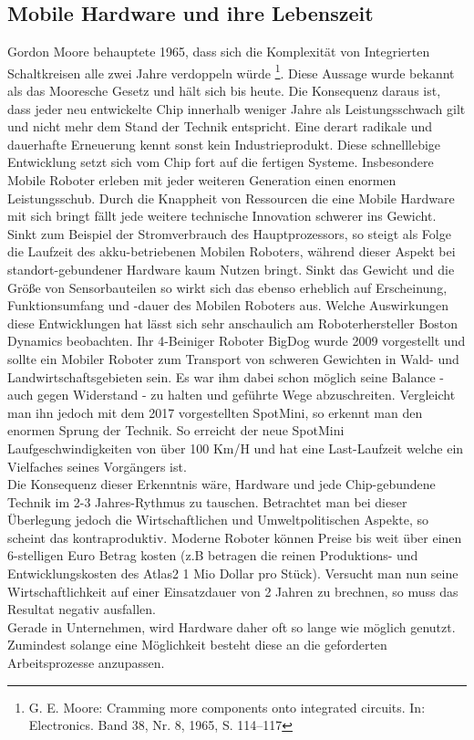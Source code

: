 \documentclass[twoside,12pt,a4paper]{report}
\begin{document}
	
	
	\subsection{Mobile Hardware und ihre Lebenszeit}
	Gordon Moore behauptete 1965, dass sich die Komplexität von Integrierten Schaltkreisen alle zwei Jahre verdoppeln würde \footnote{ G. E. Moore: Cramming more components onto integrated circuits. In: Electronics. Band 38, Nr. 8, 1965, S. 114–117}. Diese Aussage wurde bekannt als das Mooresche Gesetz und hält sich bis heute. Die Konsequenz daraus ist, dass jeder neu entwickelte Chip innerhalb weniger Jahre als Leistungsschwach gilt und nicht mehr dem Stand der Technik entspricht. Eine derart radikale und dauerhafte Erneuerung kennt sonst kein Industrieprodukt. Diese schnelllebige Entwicklung setzt sich vom Chip fort auf die fertigen Systeme. Insbesondere Mobile Roboter erleben mit jeder weiteren Generation einen enormen Leistungsschub. Durch die Knappheit von Ressourcen die eine Mobile Hardware mit sich bringt fällt jede weitere technische Innovation schwerer ins Gewicht. Sinkt zum Beispiel der Stromverbrauch des Hauptprozessors, so steigt als Folge die Laufzeit des akku-betriebenen Mobilen Roboters, während dieser Aspekt bei standort-gebundener Hardware kaum Nutzen bringt. Sinkt das Gewicht und die Größe von Sensorbauteilen so wirkt sich das ebenso erheblich auf Erscheinung, Funktionsumfang und -dauer des Mobilen Roboters aus. Welche Auswirkungen diese Entwicklungen hat lässt sich sehr anschaulich am Roboterhersteller Boston Dynamics beobachten. Ihr 4-Beiniger Roboter BigDog wurde 2009 vorgestellt und sollte ein Mobiler Roboter zum Transport von schweren Gewichten in Wald- und Landwirtschaftsgebieten sein. Es war ihm dabei schon möglich seine Balance - auch gegen Widerstand - zu halten und geführte Wege abzuschreiten. Vergleicht man ihn jedoch mit dem 2017 vorgestellten SpotMini, so erkennt man den enormen Sprung der Technik. So erreicht der neue SpotMini Laufgeschwindigkeiten von über 100 Km/H und hat eine Last-Laufzeit welche ein Vielfaches seines Vorgängers ist. \\
	Die Konsequenz dieser Erkenntnis wäre, Hardware und jede Chip-gebundene Technik im 2-3 Jahres-Rythmus zu tauschen. Betrachtet man bei dieser Überlegung jedoch die Wirtschaftlichen und Umweltpolitischen Aspekte, so scheint das kontraproduktiv. Moderne Roboter können Preise bis weit über einen 6-stelligen Euro Betrag kosten (z.B betragen die reinen Produktions- und Entwicklungskosten des Atlas2 1 Mio Dollar pro Stück). Versucht man nun seine Wirtschaftlichkeit auf einer Einsatzdauer von 2 Jahren zu brechnen, so muss das Resultat negativ ausfallen. \\
	Gerade in Unternehmen, wird Hardware daher oft so lange wie möglich genutzt. Zumindest solange eine Möglichkeit besteht diese an die geforderten Arbeitsprozesse anzupassen. \\
	
\end{document}
